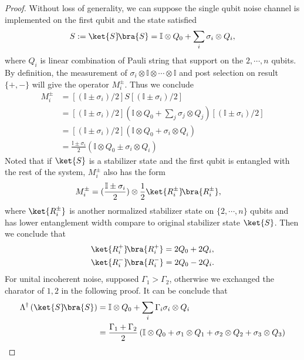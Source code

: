 \documentclass[aps,%
twocolumn,%
floatfix,%
pra,%
amsfonts,%
longbibliography,%
groupedaddress,%
superscriptaddress]{revtex4-2}%
\newcommand{\1}{\mathbbm{1}}
\begin{document}
\begin{proof}
    Without loss of generality, we can suppose the single qubit noise channel is implemented on the first qubit and the state satisfied
    \begin{align}
        S:=\ket{S}\!\bra{S} = \mathbb{I} \otimes Q_0 + \sum_i \sigma_i\otimes Q_i,
    \end{align}
    where $Q_i$ is linear combination of Pauli string that support on the $2,\cdots,n$ qubits. 
By definition, the measurement of $\sigma_i \otimes\mathbb{I} \otimes \cdots \otimes \mathbb{I}$ and post selection on result $\{+,-\}$ will give the operator $M_i^{\pm}$. Thus we conclude
\begin{align}
    M_i^{\pm} &=[(\mathbb{I} \pm \sigma_i)/2]S[(\mathbb{I} \pm \sigma_i)/2]  \\
    &= [(\mathbb{I} \pm \sigma_i)/2]\left(\mathbb{I} \otimes Q_0 + \sum_j \sigma_j\otimes Q_j \right)[(\mathbb{I} \pm \sigma_i)/2]\\
     &= [(\mathbb{I} \pm \sigma_i)/2]\left(\mathbb{I} \otimes Q_0 +  \sigma_i\otimes Q_i \right)\\
     &=\frac{\mathbb{I} \pm \sigma_i}{2}\left(\mathbb{I} \otimes Q_0 \pm  \sigma_i\otimes Q_i \right)
\end{align}
Noted that if $\ket{S}$ is a stabilizer state and the first qubit is entangled with the rest of the system, $M_i^{\pm}$ also has the form
\begin{align}
    M_i^{\pm} &= (\frac{\mathbb{I} \pm \sigma_i}{2}) \otimes \frac{1}{2}\ket{R^{\pm}_i}\!\bra{R^{\pm}_i},
\end{align}
where $\ket{R_i^\pm}$ is another normalized stabilizer state on $\{2,\cdots,n\}$ qubits and has lower entanglement width compare to original stabilizer state $\ket{S}$.
Then we conclude that
\begin{align}
   &\ket{R^{+}_i}\!\bra{R^{+}_i} =2Q_0+ 2Q_i ,\\
    & \ket{R^{-}_i}\!\bra{R^{-}_i} =2Q_0- 2Q_i .
\end{align}
For unital incoherent noise, supposed $\Gamma_1 > \Gamma_2$, otherwise we exchanged the charator of $1,2$ in the following proof. It can be conclude that
\begin{align}
    \Lambda^\dagger\left(\ket{S}\!\bra{S}\right) &= \mathbb{I} \otimes Q_{0} + \sum_{i } \Gamma_i \sigma_i \otimes Q_i \\
    &=\frac{\Gamma_1+ \Gamma_2}{2} \left( \mathbb{I} \otimes Q_0 + \sigma_1\otimes Q_1 + \sigma_2\otimes Q_2 + \sigma_3\otimes Q_3\right)\\

\end{align}
\end{proof}
\end{document}
